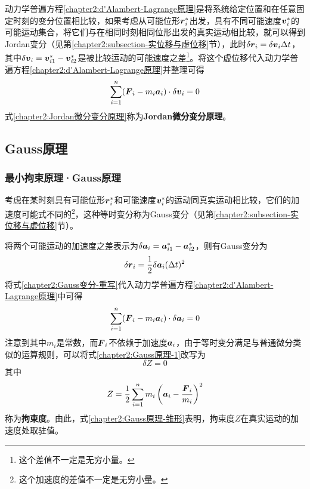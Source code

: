 动力学普遍方程\eqref{chapter2:d'Alambert-Lagrange原理}是将系统给定位置和在任意固定时刻的变分位置相比较，如果考虑从可能位形$\boldsymbol{r}_i^*$出发，具有不同可能速度$\boldsymbol{v}_i^*$的可能运动集合，将它们与在相同时刻相同位形出发的真实运动相比较，就可以得到Jordan变分（见第\ref{chapter2:subsection-实位移与虚位移}节），此时$\delta\boldsymbol{r}_i=\delta \boldsymbol{v}_i\Delta t$，其中$\delta\boldsymbol{v}_i=\boldsymbol{v}_{i1}^*-\boldsymbol{v}_{i2}^*$是被比较运动的可能速度之差\footnote{这个差值不一定是无穷小量。}。将这个虚位移代入动力学普遍方程\eqref{chapter2:d'Alambert-Lagrange原理}并整理可得
\begin{equation}
	\sum_{i=1}^n (\boldsymbol{F}_i-m_i\boldsymbol{a}_i)\cdot \delta \boldsymbol{v}_i = 0
	\label{chapter2:Jordan微分变分原理}
\end{equation}
式\eqref{chapter2:Jordan微分变分原理}称为{\bf Jordan微分变分原理}。

\subsection{Gauss原理}

\subsubsection{最小拘束原理·Gauss原理}\label{chapter2:subsubsection-最小拘束原理·Gauss原理}

考虑在某时刻具有可能位形$\boldsymbol{r}_i^*$和可能速度$\boldsymbol{v}_i^*$的运动同真实运动相比较，它们的加速度可能式不同的\footnote{这个加速度的差值不一定是无穷小量。}，这种等时变分称为Gauss变分（见第\ref{chapter2:subsection-实位移与虚位移}节）。

将两个可能运动的加速度之差表示为$\delta\boldsymbol{a}_i=\boldsymbol{a}_{i1}^*-\boldsymbol{a}_{i2}^*$，则有Gauss变分为
\begin{equation}
	\delta\boldsymbol{r}_i = \frac12 \delta\boldsymbol{a}_i(\Delta t)^2
	\label{chapter2:Gauss变分-重写}
\end{equation}
将式\eqref{chapter2:Gauss变分-重写}代入动力学普遍方程\eqref{chapter2:d'Alambert-Lagrange原理}中可得
\begin{equation}
	\sum_{i=1}^n (\boldsymbol{F}_i-m_i\boldsymbol{a}_i)\cdot \delta\boldsymbol{a}_i=0
	\label{chapter2:Gauss原理-1}
\end{equation}
注意到其中$m_i$是常数，而$\boldsymbol{F}_i$不依赖于加速度$\boldsymbol{a}_i$，由于等时变分满足与普通微分类似的运算规则，可以将式\eqref{chapter2:Gauss原理-1}改写为
\begin{equation}
	\delta Z = 0
	\label{chapter2:Gauss原理-雏形}
\end{equation}
其中
\begin{equation}
	Z = \frac12 \sum_{i=1}^nm_i\left(\boldsymbol{a}_i-\frac{\boldsymbol{F}_i}{m_i}\right)^2
	\label{chapter2:拘束度定义}
\end{equation}
称为{\bf 拘束度}。由此，式\eqref{chapter2:Gauss原理-雏形}表明，拘束度$Z$在真实运动的加速度处取驻值。

